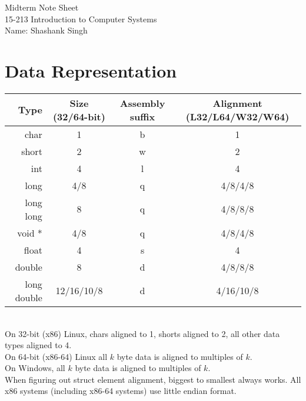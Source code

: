 \documentclass[11pt]{article}
\newcommand{\myname}{Shashank Singh}
\newcommand{\myclass}{15-213 Introduction to Computer Systems}
\begin{document}
\thispagestyle{plain}

{\Large Midterm Note Sheet} \\
\myclass \\
Name: \myname \\

\section{Data Representation}
\begin{tabular}{|r|c|c|c|}
\hline
Type        & Size (32/64-bit) & Assembly suffix & Alignment (L32/L64/W32/W64) \\
\hline
char        &  1               & b               & 1                           \\
\hline
short       &  2               & w               & 2                           \\
\hline
int         &  4               & l               & 4                           \\
\hline
long        &  4/8             & q               & 4/8/4/8                     \\
\hline
long long   &  8               & q               & 4/8/8/8                     \\
\hline
void *      &  4/8             & q               & 4/8/4/8                     \\
\hline
float       &  4               & s               & 4                           \\
\hline
double      &  8               & d               & 4/8/8/8                     \\
\hline
long double &  12/16/10/8      & d               & 4/16/10/8                   \\
\hline
\end{tabular} \\
On 32-bit (x86) Linux, chars aligned to 1, shorts aligned to 2, all other data types
aligned to 4. \\
On 64-bit (x86-64) Linux all $k$ byte data is aligned to multiples of $k$. \\
On Windows, all $k$ byte data is aligned to multiples of $k$. \\
When figuring out struct element alignment, biggest to smallest always works.
All x86 systems (including x86-64 systems) use little endian format.
\end{document}
